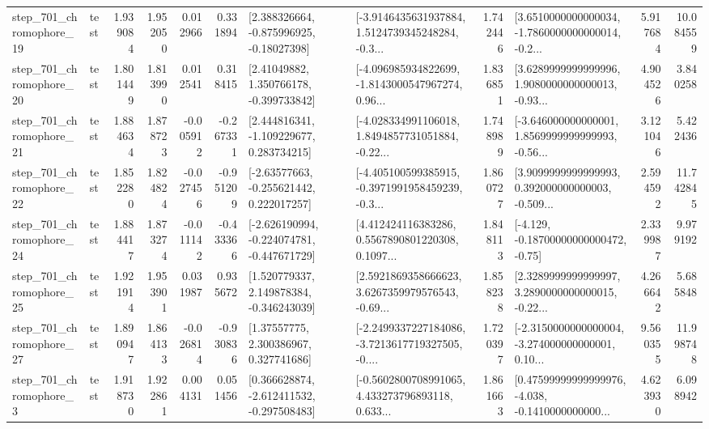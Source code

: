 \begin{tabular}{llrrrrllrlrr}
  step\_701\_chromophore\_19 &      test &      1.939084 &    1.952050 &      0.012966 &  0.331894 &    [2.388326664, -0.875996925, -0.18027398] &  [-3.9146435631937884, 1.5124739345248284, -0.3... &       1.742446 &  [3.6510000000000034, -1.7860000000000014, -0.2... &            5.917684 &         10.084559 \\
  step\_701\_chromophore\_20 &      test &      1.801449 &    1.813990 &      0.012541 &  0.318415 &     [2.41049882, 1.350766178, -0.399733842] &  [-4.096985934822699, -1.8143000547967274, 0.96... &       1.836851 &  [3.6289999999999996, 1.9080000000000013, -0.93... &            4.904526 &          3.840258 \\
  step\_701\_chromophore\_21 &      test &      1.884634 &    1.878723 &     -0.005912 & -0.267331 &    [2.444816341, -1.109229677, 0.283734215] &  [-4.028334991106018, 1.8494857731051884, -0.22... &       1.748989 &  [-3.646000000000001, 1.8569999999999993, -0.56... &            3.121046 &          5.422436 \\
  step\_701\_chromophore\_22 &      test &      1.852280 &    1.824824 &     -0.027456 & -0.951209 &    [-2.63577663, -0.255621442, 0.222017257] &  [-4.405100599385915, -0.3971991958459239, -0.3... &       1.860727 &  [3.9099999999999993, 0.392000000000003, -0.509... &            2.594592 &         11.742845 \\
  step\_701\_chromophore\_24 &      test &      1.884417 &    1.873274 &     -0.011142 & -0.433366 &  [-2.626190994, -0.224074781, -0.447671729] &  [4.412424116383286, 0.5567890801220308, 0.1097... &       1.848113 &              [-4.129, -0.18700000000000472, -0.75] &            2.339987 &          9.979192 \\
  step\_701\_chromophore\_25 &      test &      1.921914 &    1.953901 &      0.031987 &  0.935672 &    [1.520779337, 2.149878384, -0.346243039] &  [2.5921869358666623, 3.6267359979576543, -0.69... &       1.858238 &  [2.3289999999999997, 3.2890000000000015, -0.22... &            4.266642 &          5.685848 \\
  step\_701\_chromophore\_27 &      test &      1.890947 &    1.864133 &     -0.026814 & -0.930836 &      [1.37557775, 2.300386967, 0.327741686] &  [-2.2499337227184086, -3.7213617719327505, -0.... &       1.720397 &  [-2.3150000000000004, -3.274000000000001, 0.10... &            9.560355 &         11.998748 \\
   step\_701\_chromophore\_3 &      test &      1.918730 &    1.922861 &      0.004131 &  0.051456 &   [0.366628874, -2.612411532, -0.297508483] &  [-0.5602800708991065, 4.433273796893118, 0.633... &       1.861663 &  [0.47599999999999976, -4.038, -0.1410000000000... &            4.623930 &          6.098942 \\

\end{tabular}
